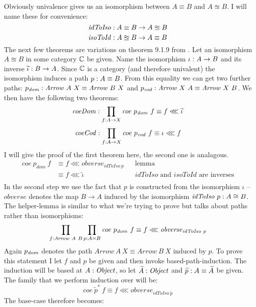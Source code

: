 Obviously univalence gives us an isomorphism between $A \equiv B$ and $A
\approxeq B$. I will name these for convenience:
%
$$
\mathit{idToIso} \mathrel{:} A \equiv B \to A \approxeq B
$$
%
$$
\mathit{isoToId} \mathrel{:} A \approxeq B \to A \equiv B
$$
%
The next few theorems are variations on theorem 9.1.9 from \cite{hott-2013}. Let
an isomorphism $A \approxeq B$ in some category $\mathbb{C}$ be given. Name the
isomorphism $\iota \mathrel{:} A \to B$ and its inverse $\widetilde{\iota} \mathrel{:} B \to A$.
Since $\mathbb{C}$ is a category (and therefore univalent) the isomorphism induces a
path $p \mathrel{:} A \equiv B$. From this equality we can get two further paths:
$p_{\mathit{dom}} \mathrel{:} \mathit{Arrow}\ A\ X \equiv \mathit{Arrow}\ B\ X$ and
$p_{\mathit{cod}} \mathrel{:} \mathit{Arrow}\ X\ A \equiv \mathit{Arrow}\ X\ B$. We
then have the following two theorems:
%
$$
\mathit{coeDom} \mathrel{:} \prod_{f \mathrel{:} A \to X} \mathit{coe}\ p_{\mathit{dom}}\ f \equiv f \lll \widetilde{\iota}
$$
%
%
\begin{align}
\label{eq:coeCod}
\mathit{coeCod} \tp \prod_{f \tp A \to X} \mathit{coe}\ p_{\mathit{cod}}\ f \equiv \iota \lll f
\end{align}
%
I will give the proof of the first theorem here, the second one is analagous.
\begin{align*}
\mathit{coe}\ p_{\mathit{dom}}\ f
  & \equiv f \lll \mathit{obverse}_{\mathit{idToIso}\ p} && \text{lemma} \\
  & \equiv f \lll \widetilde{\iota}
    && \text{$\mathit{idToIso}$ and $\mathit{isoToId}$ are inverses}\\
\end{align*}
%
In the second step we use the fact that $p$ is constructed from the isomorphism
$\iota$ -- $\mathit{obverse}$ denotes the map $B \to A$ induced by the
isomorphism $\mathit{idToIso}\ p \tp A \cong B$. The helper-lemma is similar to
what we're trying to prove but talks about paths rather than isomorphisms:
%
$$
\prod_{f \mathrel{:} \mathit{Arrow}\ A\ B} \prod_{p \mathrel{:} A \equiv B} \mathit{coe}\ p_{\mathit{dom}}\ f \equiv f \lll \mathit{obverse}_{\mathit{idToIso}\ p}
$$
%
Again $p_{\mathit{dom}}$ denotes the path $\mathit{Arrow}\ A\ X \equiv
\mathit{Arrow}\ B\ X$ induced by $p$. To prove this statement I let $f$ and $p$
be given and then invoke based-path-induction. The induction will be based at $A
\mathrel{:} \mathit{Object}$, so let $\widetilde{A} \mathrel{:} \mathit{Object}$ and $\widetilde{p} \mathrel{:}
A \equiv \widetilde{A}$ be given. The family that we perform induction over will
be:
%
$$
\mathit{coe}\ {\widetilde{p}}^*\ f \equiv f \lll \mathit{obverse}_{\mathit{idToIso}\ \widetilde{p}}
$$
The base-case therefore becomes:
